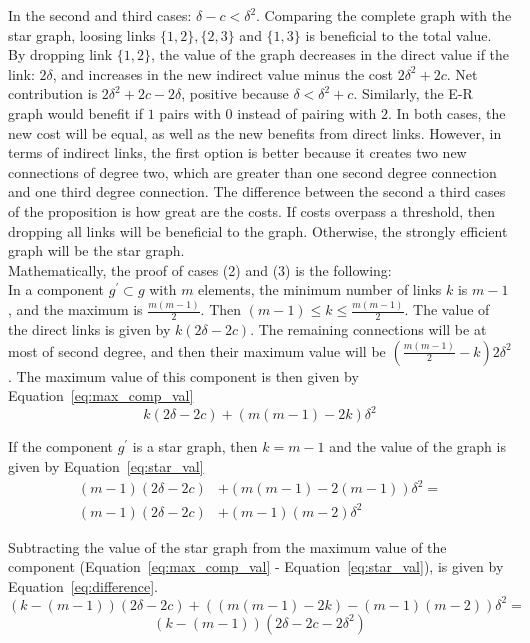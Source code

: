 \documentclass[a4paper, 11pt]{article}
\begin{document}
In the second and third cases: $\delta - c < \delta^2$. Comparing the complete graph with the star graph, loosing links $\{1, 2\}, \{2, 3\}$ and $\{1, 3\}$ is beneficial to the total value. By dropping link $\{1, 2\}$, the value of the graph decreases in the direct value if the link: $2\delta$, and increases in the new indirect value minus the cost $2\delta^2 + 2c$. Net contribution is $2\delta^2 + 2c - 2\delta$, positive because $\delta < \delta^2 + c$. Similarly, the E-R graph would benefit if $1$ pairs with $0$ instead of pairing with $2$. In both cases, the new cost will be equal, as well as the new benefits from direct links. However, in terms of indirect links, the first option is better because it creates two new connections of degree two, which are greater than one second degree connection and one third degree connection. The difference between the second a third cases of the proposition is how great are the costs. If costs overpass a threshold, then dropping all links will be beneficial to the graph. Otherwise, the strongly efficient graph will be the star graph.\\

Mathematically, the proof of cases (2) and (3) is the following:\\

In a component $g^\prime \subset g$ with $m$ elements, the minimum number of links $k$ is $m-1$, and the maximum is $\frac{m(m-1)}{2}$. Then $(m-1) \leq k \leq \frac{m(m - 1)}{2}$. The value of the direct links is given by $k(2\delta - 2c)$. The remaining connections will be at most of second degree, and then their maximum value will be $(\frac{m(m-1)}{2}-k)2\delta^2$. The maximum value of this component is then given by Equation~\ref{eq:max_comp_val}\\
\begin{equation}
k(2\delta - 2c) + (m(m-1)-2k)\delta^2 \label{eq:max_comp_val}
\end{equation}

If the component $g^\prime$ is a star graph, then $k = m-1$ and the value of the graph is given by Equation~\ref{eq:star_val}\\
\begin{align}
(m-1)(2\delta - 2c) &+ (m(m-1)-2(m-1))\delta^2 = \nonumber \\
(m-1)(2\delta - 2c) &+ (m-1)(m-2)\delta^2 \label{eq:star_val}
\end{align}

Subtracting the value of the star graph from the maximum value of the component (Equation~\ref{eq:max_comp_val} - Equation~\ref{eq:star_val}), is given by Equation~\ref{eq:difference}.
\begin{equation*}
(k - (m-1))(2\delta - 2c) + ((m(m-1)-2k) - (m-1)(m-2))\delta^2 =
\end{equation*}
\begin{equation}
(k - (m-1))(2\delta - 2c - 2\delta^2) \label{eq:difference}
\end{equation}
\end{document}
